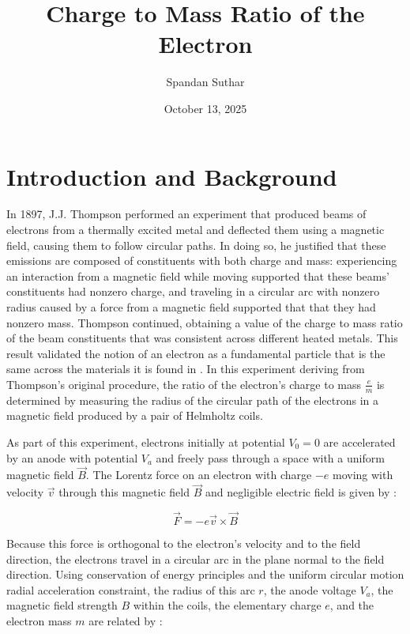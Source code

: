 \documentclass[11pt]{article}
\title{Charge to Mass Ratio of the Electron}
\author{Spandan Suthar}
\date{October 13, 2025}
\begin{document}
\maketitle

\section{Introduction and Background}

In 1897, J.J. Thompson performed an experiment
that produced
beams of electrons from a thermally excited metal and deflected them using a
magnetic field, causing them to follow circular paths.
In doing so, he justified that these emissions are composed of
constituents with both charge and mass: experiencing an interaction
from a magnetic field while moving supported that these beams' constituents had
nonzero charge, and traveling in a circular arc with nonzero radius
caused by a force from a magnetic field supported that that they had
nonzero mass.
Thompson continued, obtaining a value of the charge to mass ratio
of the beam constituents that was consistent across different heated metals.
This result validated the notion of an electron as a fundamental
particle that is the same across the materials it is found in
\cite{thomp, young}.  In this experiment deriving from Thompson's
original procedure, the ratio of the
electron's charge to mass $\frac{e}{m}$ is determined by measuring the radius of
the circular path of the electrons in a magnetic field produced by a pair of
Helmholtz coils.


\vspace{1em}

As part of this experiment, electrons initially at potential $V_0 = 0$ are
accelerated by an anode with potential $V_a$ and freely pass
through a space with a uniform magnetic field $\vec B$. The Lorentz
force on an electron with charge $-e$ moving with velocity $\vec v$
through this magnetic field $\vec B$ and negligible electric field is
given by \cite{griff, young}:

\begin{equation}
  \label{eq:lorentz_force}
  \vec{F} = -e \vec{v} \times \vec{B}
\end{equation}

Because this force is orthogonal to the electron's velocity
and to the field direction, the electrons travel in a circular arc
in the plane normal to the field direction. Using conservation of
energy principles and the uniform circular motion radial acceleration
constraint, the radius of this arc $r$, the anode
voltage $V_a$, the
magnetic field strength $B$ within the coils, the elementary charge $e$, and the
electron mass $m$ are related by \cite{thomp, young}:
\end{document}
